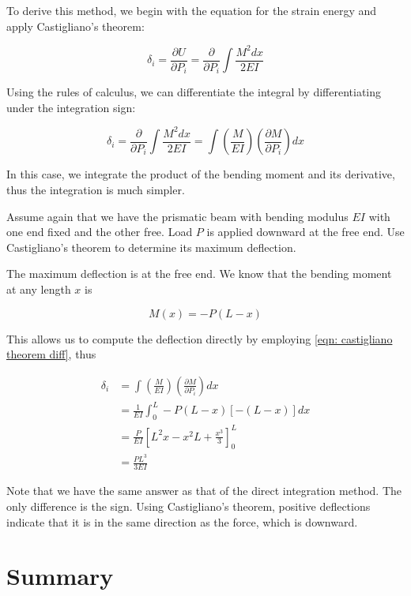 \documentclass[
10pt,
a4paper,
openany,
svgnames,
]{kaobook} %
\begin{document}
To derive this method, we begin with the equation for the strain energy and apply Castigliano’s theorem:

\[\delta _i = \frac{\partial U}{\partial P_i} = \frac{\partial }{\partial P_i}\int \frac{M^2dx}{2EI} \]

Using the rules of calculus, we can differentiate the integral by differentiating under the integration sign:

\begin{equation} \label{eqn: castigliano theorem diff}
  \delta _i = \frac{\partial }{\partial P_i}\int \frac{M^2dx}{2EI}  = \int \left( \frac{M}{EI} \right) \left( \frac{\partial M}{\partial P_i} \right)dx
\end{equation}

In this case, we integrate the product of the bending moment and its derivative, thus the integration is much simpler.

\begin{example}
Assume again that we have the prismatic beam with bending modulus $EI$ with one end fixed and the other free. Load $P$ is applied downward at the free end. Use Castigliano’s theorem to determine its maximum deflection.
\end{example}
\begin{solution}
The maximum deflection is at the free end. We know that the bending moment at any length $x$ is

\[M(x) =  - P(L - x)\]

This allows us to compute the deflection directly by employing \cref{eqn: castigliano theorem diff}, thus

\begin{align*}
  \delta_i &= \int \left( \frac{M}{EI} \right)\left( \frac{\partial M}{\partial P_i} \right)dx \\ 
              &= \frac{1}{EI}\int_0^L - P(L - x)[ - (L - x)]dx  \\ 
              &= \frac{P}{EI}\left[ L^2x - x^2L + \frac{x^3}{3} \right]_0^L \\ 
              &= \frac{PL^3}{3EI} 
\end{align*}	

Note that we have the same answer as that of the direct integration method. The only difference is the sign. Using Castigliano's theorem, positive deflections indicate that it is in the same direction as the force, which is downward.
\end{solution}

\section*{Summary}
\end{document}

